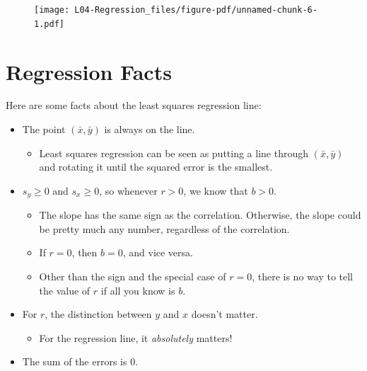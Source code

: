 \documentclass[
  letterpaper,
  DIV=11,
  numbers=noendperiod]{scrreprt}
\providecommand{\tightlist}{%
  \setlength{\itemsep}{0pt}\setlength{\parskip}{0pt}}\usepackage{longtable,booktabs,array}
\begin{document}
\begin{figure}[H]

{\centering \texttt{[image: L04-Regression\_files/figure-pdf/unnamed-chunk-6-1.pdf]}

}

\end{figure}

\hypertarget{regression-facts}{%
\chapter{Regression Facts}\label{regression-facts}}

Here are some facts about the least squares regression line:

\begin{itemize}
\tightlist
\item
  The point \((\bar x, \bar y)\) is always on the line.

  \begin{itemize}
  \tightlist
  \item
    Least squares regression can be seen as putting a line through
    \((\bar x, \bar y)\) and rotating it until the squared error is the
    smallest.
  \end{itemize}
\item
  \(s_y\ge 0\) and \(s_x\ge 0\), so whenever \(r > 0\), we know that
  \(b > 0\).

  \begin{itemize}
  \tightlist
  \item
    The slope has the same sign as the correlation. Otherwise, the slope
    could be pretty much any number, regardless of the correlation.
  \item
    If \(r = 0\), then \(b = 0\), and vice versa.
  \item
    Other than the sign and the special case of \(r=0\), there is no way
    to tell the value of \(r\) if all you know is \(b\).
  \end{itemize}
\item
  For \(r\), the distinction between \(y\) and \(x\) doesn't matter.

  \begin{itemize}
  \tightlist
  \item
    For the regression line, it \emph{absolutely} matters!
  \end{itemize}
\item
  The sum of the errors is 0.
\end{itemize}
\end{document}
